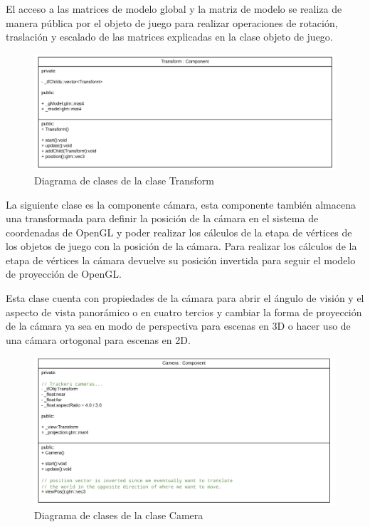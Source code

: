 \documentclass[a4paper, 17pt]{book}
\begin{document}
\vspace{1mm} %

El acceso a las matrices de modelo global y la matriz de modelo se realiza de manera pública por el objeto de juego para realizar operaciones
de rotación, traslación y escalado de las matrices explicadas en la clase objeto de juego.

\begin{figure}[H]
    \centering
    \includegraphics[scale=0.3, keepaspectratio]{img/Transform.png}
    \caption{Diagrama de clases de la clase Transform}
    \label{figura:Component}
\end{figure}

La siguiente clase es la componente cámara, esta componente también almacena una transformada para definir la posición de la cámara en el
sistema de coordenadas de OpenGL y poder realizar los cálculos de la etapa de vértices de los objetos de juego con la posición de la cámara.
Para realizar los cálculos de la etapa de vértices la cámara devuelve su posición invertida para seguir el modelo de proyección de OpenGL.

\vspace{1mm} %

Esta clase cuenta con propiedades de la cámara para abrir el ángulo de visión y el aspecto de vista panorámico o en cuatro tercios y cambiar
la forma de proyección de la cámara ya sea en modo de perspectiva para escenas en 3D o hacer uso de una cámara ortogonal para 
escenas en 2D.

\begin{figure}[H]
    \centering
    \includegraphics[scale=0.3, keepaspectratio]{img/Camera.png}
    \caption{Diagrama de clases de la clase Camera}
    \label{figura:Component}
\end{figure}
\end{document}
